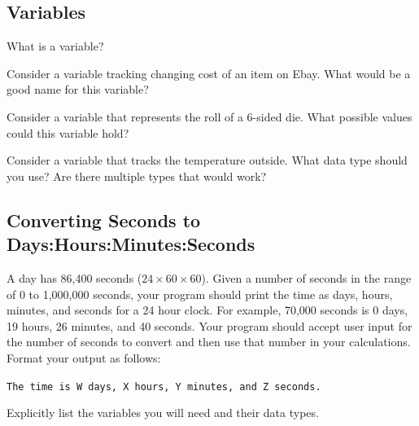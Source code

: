 \subsection{Variables}

\begin{multipart}
    What is a variable?
\end{multipart}

\vspace{2cm}

\begin{multipart}
    Consider a variable tracking changing cost of an item on Ebay. What would be a good name for this variable?
\end{multipart}

\vspace{1.5cm}

\begin{multipart}
    Consider a variable that represents the roll of a 6-sided die. What possible values could this variable hold? 
\end{multipart}

\vspace{1.5cm}

\begin{multipart}
    Consider a variable that tracks the temperature outside. What data type should you use? Are there multiple types that would work?
\end{multipart}

\vspace{1.5cm}

\subsection{Converting Seconds to Days:Hours:Minutes:Seconds}
A day has 86,400 seconds ($24 \times 60 \times 60$). Given a number of seconds in the range of 0 to 1,000,000 seconds, your program should print the time as days, hours, minutes, and seconds for a 24 hour clock. For example, 70,000 seconds is 0 days, 19 hours, 26 minutes, and 40 seconds. Your program should accept user input for the number of seconds to convert and then use that number in your calculations. Format your output as follows: 

\texttt{The time is W days, X hours, Y minutes, and Z seconds.}

\begin{multipart}
    Explicitly list the variables you will need and their data types. 
\end{multipart}


